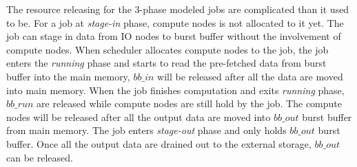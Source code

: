 

The resource releasing for the 3-phase modeled jobs are complicated than it used to be. 
For a job at \textit{stage-in} phase, compute nodes is not allocated to it yet. 
The job can stage in data from IO nodes to burst buffer without the involvement of compute nodes.
When scheduler allocates compute nodes to the job, the job enters the \textit{running} phase 
and starts to read the pre-fetched data from burst buffer into the main memory, 
$bb\_in$ will be released after all the data are moved into main memory. 
When the job finishes computation and exits \textit{running} phase, 
$bb\_run$ are released while compute nodes are still hold by the job. 
The compute nodes will be released after all the output data are moved into $bb\_out$ burst buffer from main memory.
The job enters \textit{stage-out} phase and only holds $bb\_out$ burst buffer. 
Once all the output data are drained out to the external storage,  
$bb\_out$ can be released. 
